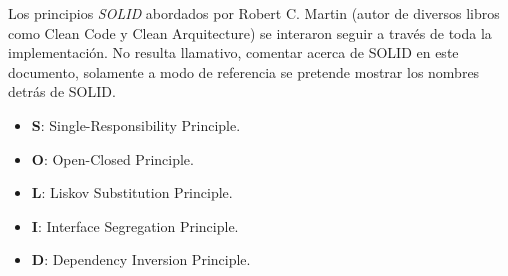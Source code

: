 Los principios \textit{SOLID} abordados por Robert C. Martin (autor de diversos libros como Clean Code y Clean Arquitecture) se interaron seguir a través de toda la implementación. No resulta llamativo, comentar acerca de SOLID en este documento, solamente a modo de referencia se pretende mostrar los nombres detrás de SOLID.\cite{solid_medium}
\begin{itemize}
	\item \textbf{S}: Single-Responsibility Principle.
	\item \textbf{O}: Open-Closed Principle.
	\item \textbf{L}: Liskov Substitution Principle.
	\item \textbf{I}: Interface Segregation Principle.
	\item \textbf{D}: Dependency Inversion Principle.
\end{itemize}




